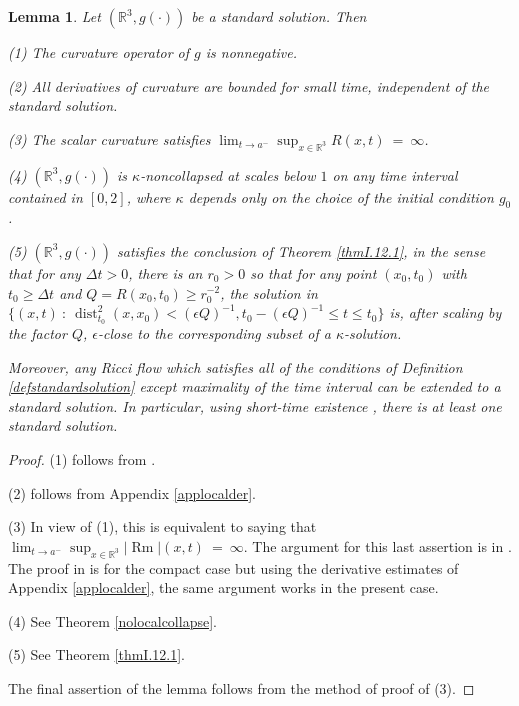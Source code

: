 \documentclass[12pt]{amsart}
\newcommand{\dist}{\operatorname{dist}}
\newcommand{\R}{{\mathbb R}}
\newcommand{\Rm}{\operatorname{Rm}}
\numberwithin{equation}{section}
\theoremstyle{plain}
\newtheorem{lemma}[equation]{Lemma}
\theoremstyle{definition}
\theoremstyle{remark}
\begin{document}
\begin{lemma}
\label{lemstandard0}
Let $(\R^3,g(\cdot))$ be a standard solution.  Then 

(1) The curvature operator of $g$ is nonnegative.

(2) All derivatives of curvature are bounded for small time,
independent of the standard solution.

(3) The scalar curvature satisfies $\lim_{t \rightarrow a^-}
\sup_{x \in \R^3} R(x,t) \: = \: \infty$.

(4) $(\R^3,g(\cdot))$ is $\kappa$-noncollapsed at scales below $1$ on any time
interval contained in $[0,2]$, where
$\kappa$ depends only on the choice of the initial condition $g_0$.

(5) $(\R^3,g(\cdot))$ satisfies the conclusion of Theorem \ref{thmI.12.1},
in the sense that for any $\Delta t > 0$, there is an $r_0 > 0$ so that
for any point $(x_0, t_0)$ with $t_0 \ge \Delta t$ and
$Q = R(x_0, t_0) \ge r_0^{-2}$, the solution in
$\{(x,t) \: : \: \dist_{t_0}^2(x, x_0) < (\epsilon Q)^{-1}, t_0 - (\epsilon Q)^{-1}
\le t \le t_0\}$ is, after scaling by the factor $Q$, $\epsilon$-close to the
corresponding subset of a $\kappa$-solution. 

Moreover, any Ricci flow which satisfies all of the conditions of Definition 
\ref{defstandardsolution} except maximality of the time interval can be
extended to a standard solution. In particular, using short-time
existence \cite[Theorem 1.1]{Shi2 (1989)}, there is at least one standard solution.
\end{lemma}
\begin{proof}
(1) follows from \cite[Theorem 4.14]{Shi3 (1989)}.

(2) follows from Appendix \ref{applocalder}.

(3) 
In view of (1), this is equivalent to saying that
$\lim_{t \rightarrow a^-}
\sup_{x \in \R^3} |\Rm|(x,t) \: = \: \infty$. The argument for
this last assertion
is in \cite[Chapter 6.7.2]{Chow-Knopf}. The proof in 
\cite[Chapter 6.7.2]{Chow-Knopf}
is for the compact case but using the derivative estimates of
Appendix \ref{applocalder}, the same argument works in 
the present case. 


(4) See Theorem \ref{nolocalcollapse}.

(5) See Theorem \ref{thmI.12.1}.

The final assertion of the lemma follows from the method of
proof of (3).
\end{proof}
\end{document}
